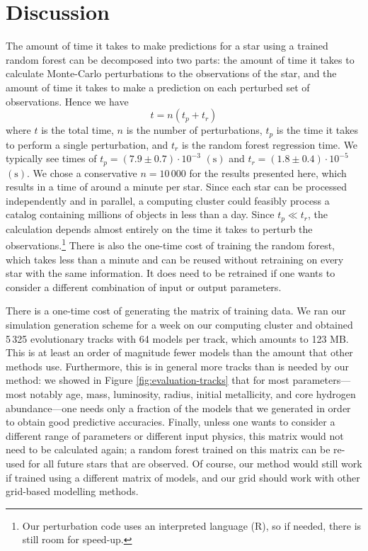 \documentclass[manuscript,linenumbers]{aastex6}
\begin{document}
\section{Discussion}
The amount of time it takes to make predictions for a star using a trained random forest can be decomposed into two parts: the amount of time it takes to calculate Monte-Carlo perturbations to the observations of the star, and the amount of time it takes to make a prediction on each perturbed set of observations. Hence we have
\begin{equation}
    t = n(t_p + t_r)
\end{equation}
where $t$ is the total time, $n$ is the number of perturbations, $t_p$ is the time it takes to perform a single perturbation, and $t_r$ is the random forest regression time. We typically see times of $t_p = (7.9 \pm 0.7) \cdot 10^{-3}$ $(\si{\s})$ and $t_r = (1.8 \pm 0.4) \cdot 10^{-5}$ $(\si{\s})$. We chose a conservative $n=10\,000$ for the results presented here, which results in a time of around a minute per star. Since each star can be processed independently and in parallel, a computing cluster could feasibly process a catalog containing millions of objects in less than a day. Since $t_p \ll t_r$, the calculation depends almost entirely on the time it takes to perturb the observations.\footnote{Our perturbation code uses an interpreted language (R), so if needed, there is still room for speed-up.} There is also the one-time cost of training the random forest, which takes less than a minute and can be reused without retraining on every star with the same information. It does need to be retrained if one wants to consider a different combination of input or output parameters. 

There is a one-time cost of generating the matrix of training data. We ran our simulation generation scheme for a week on our computing cluster and obtained 5\,325 evolutionary tracks with 64 models per track, which amounts to 123 MB. This is at least an order of magnitude fewer models than the amount that other methods use. Furthermore, this is in general more tracks than is needed by our method: we showed in Figure \ref{fig:evaluation-tracks} that for most parameters---most notably age, mass, luminosity, radius, initial metallicity, and core hydrogen abundance---one needs only a fraction of the models that we generated in order to obtain good predictive accuracies. Finally, unless one wants to consider a different range of parameters or different input physics, this matrix would not need to be calculated again; a random forest trained on this matrix can be re-used for all future stars that are observed. Of course, our method would still work if trained using a different matrix of models, and our grid should work with other grid-based modelling methods. 
\end{document}
